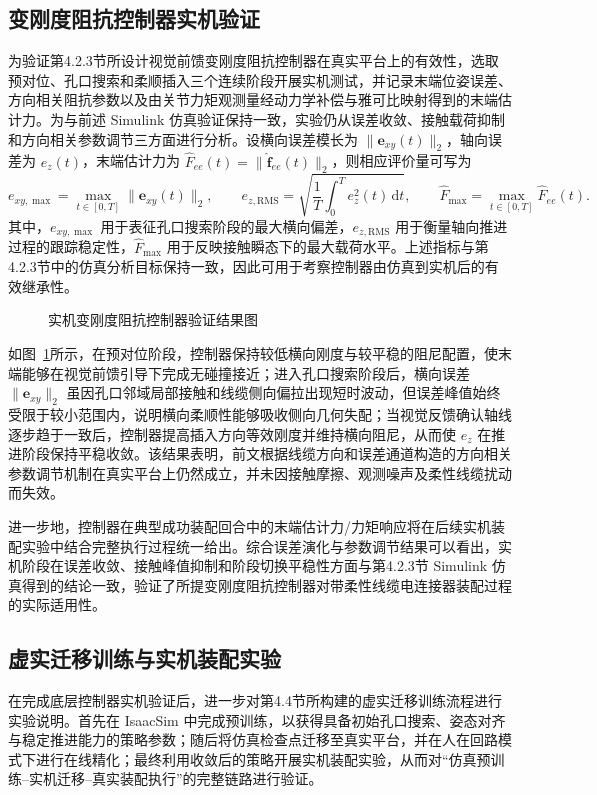 \subsection{变刚度阻抗控制器实机验证}
为验证第4.2.3节所设计视觉前馈变刚度阻抗控制器在真实平台上的有效性，选取预对位、孔口搜索和柔顺插入三个连续阶段开展实机测试，并记录末端位姿误差、方向相关阻抗参数以及由关节力矩观测量经动力学补偿与雅可比映射得到的末端估计力。为与前述 Simulink 仿真验证保持一致，实验仍从误差收敛、接触载荷抑制和方向相关参数调节三方面进行分析。设横向误差模长为 $\|\mathbf{e}_{xy}(t)\|_2$，轴向误差为 $e_z(t)$，末端估计力为 $\hat F_{ee}(t)=\|\hat{\mathbf{f}}_{ee}(t)\|_2$，则相应评价量可写为
$$
e_{xy,\max}=\max_{t\in[0,T]}\|\mathbf{e}_{xy}(t)\|_2,\qquad
e_{z,\mathrm{RMS}}=\sqrt{\frac{1}{T}\int_0^T e_z^2(t)\,\mathrm{d}t},\qquad
\hat F_{\max}=\max_{t\in[0,T]}\hat F_{ee}(t).
$$
其中，$e_{xy,\max}$ 用于表征孔口搜索阶段的最大横向偏差，$e_{z,\mathrm{RMS}}$ 用于衡量轴向推进过程的跟踪稳定性，$\hat F_{\max}$ 用于反映接触瞬态下的最大载荷水平。上述指标与第4.2.3节中的仿真分析目标保持一致，因此可用于考察控制器由仿真到实机后的有效继承性。

\begin{figure}[htbp]
  \centering
  \caption{实机变刚度阻抗控制器验证结果图}
  \label{fig:ch4:impedance-exp}
\end{figure}

如图~\ref{fig:ch4:impedance-exp}所示，在预对位阶段，控制器保持较低横向刚度与较平稳的阻尼配置，使末端能够在视觉前馈引导下完成无碰撞接近；进入孔口搜索阶段后，横向误差 $\|\mathbf{e}_{xy}\|_2$ 虽因孔口邻域局部接触和线缆侧向偏拉出现短时波动，但误差峰值始终受限于较小范围内，说明横向柔顺性能够吸收侧向几何失配；当视觉反馈确认轴线逐步趋于一致后，控制器提高插入方向等效刚度并维持横向阻尼，从而使 $e_z$ 在推进阶段保持平稳收敛。该结果表明，前文根据线缆方向和误差通道构造的方向相关参数调节机制在真实平台上仍然成立，并未因接触摩擦、观测噪声及柔性线缆扰动而失效。

进一步地，控制器在典型成功装配回合中的末端估计力/力矩响应将在后续实机装配实验中结合完整执行过程统一给出。综合误差演化与参数调节结果可以看出，实机阶段在误差收敛、接触峰值抑制和阶段切换平稳性方面与第4.2.3节 Simulink 仿真得到的结论一致，验证了所提变刚度阻抗控制器对带柔性线缆电连接器装配过程的实际适用性。

\subsection{虚实迁移训练与实机装配实验}
在完成底层控制器实机验证后，进一步对第4.4节所构建的虚实迁移训练流程进行实验说明。首先在 IsaacSim 中完成预训练，以获得具备初始孔口搜索、姿态对齐与稳定推进能力的策略参数；随后将仿真检查点迁移至真实平台，并在人在回路模式下进行在线精化；最终利用收敛后的策略开展实机装配实验，从而对“仿真预训练--实机迁移--真实装配执行”的完整链路进行验证。

